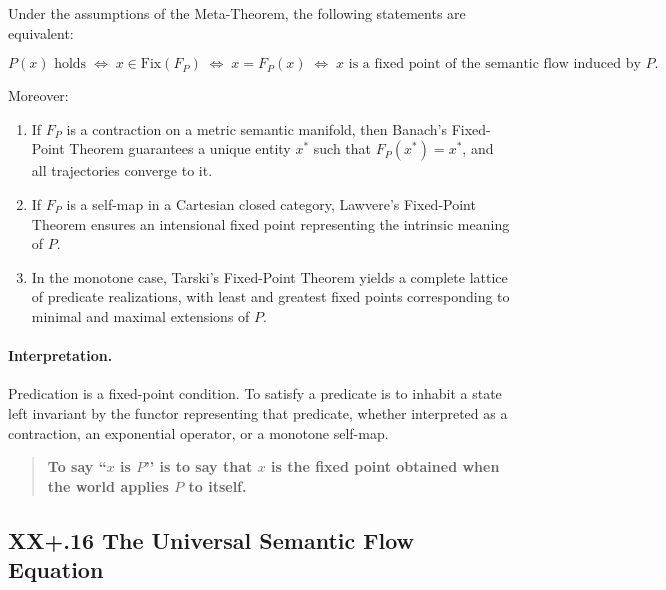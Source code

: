 \documentclass[12pt,letterpaper]{article}
\begin{document}
\begin{corollary}
Under the assumptions of the Meta-Theorem, the following statements are equivalent:

\[
P(x) \text{ holds}
\;\Longleftrightarrow\;
x \in \mathrm{Fix}(F_P)
\;\Longleftrightarrow\;
x = F_P(x)
\;\Longleftrightarrow\;
x \text{ is a fixed point of the semantic flow induced by } P.
\]

Moreover:
\begin{enumerate}
    \item If $F_P$ is a contraction on a metric semantic manifold, then Banach's
    Fixed-Point Theorem guarantees a unique entity $x^\ast$ such that $F_P(x^\ast)
    = x^\ast$, and all trajectories converge to it.

    \item If $F_P$ is a self-map in a Cartesian closed category, Lawvere's
    Fixed-Point Theorem ensures an intensional fixed point representing the
    intrinsic meaning of $P$.

    \item In the monotone case, Tarski's Fixed-Point Theorem yields a complete lattice 
    of predicate realizations, with least and greatest fixed points corresponding
    to minimal and maximal extensions of $P$.
\end{enumerate}
\end{corollary}

\paragraph{Interpretation.}
Predication is a fixed-point condition.  To satisfy a predicate is to inhabit a
state left invariant by the functor representing that predicate, whether
interpreted as a contraction, an exponential operator, or a monotone self-map.

\begin{quote}
\textbf{To say ``$x$ is $P$’’ is to say that $x$ is the fixed point obtained
when the world applies $P$ to itself.}
\end{quote}

\subsection{XX+.16 The Universal Semantic Flow Equation}
\end{document}
